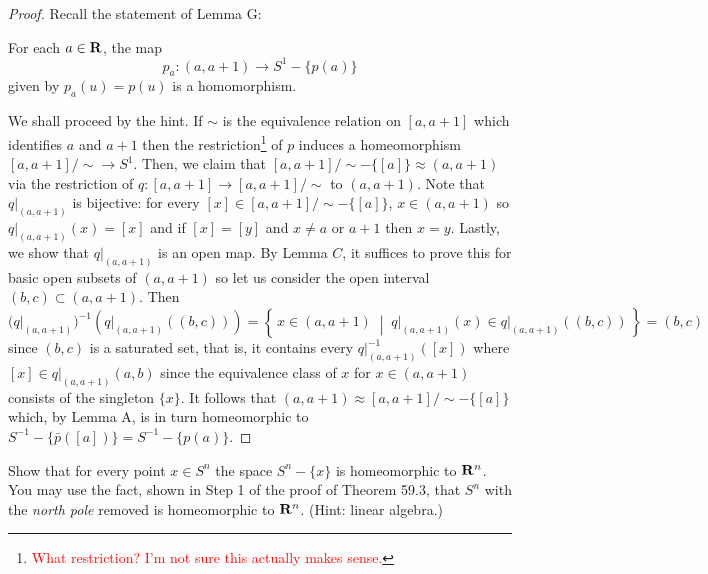 \begin{proof}
Recall the statement of Lemma G:
\begin{lemma*}[G]
For each $a\in\mathbf{R}$, the map
\[
p_a\colon(a,a+1)\longrightarrow S^1-\{p(a)\}
\]
given by $p_a(u)=p(u)$ is a homomorphism.
\end{lemma*}
We shall proceed by the hint. If $\sim$ is the equivalence
relation on $[a,a+1]$ which identifies $a$ and $a+1$ then the
restriction\footnote{\textcolor{Red}{What restriction? I'm not sure this
actually makes sense.}} of $p$ induces a homeomorphism $[a,a+1]/{\sim}\to
S^1$. Then, we claim that $[a,a+1]/{\sim}-\{[a]\}\approx(a,a+1)$ via the
restriction of $q\colon[a,a+1]\to[a,a+1]/{\sim}$ to $(a,a+1)$. Note that
$\left.q\right|_{(a,a+1)}$ is bijective: for every
$[x]\in[a,a+1]/{\sim}-\{[a]\}$, $x\in(a,a+1)$ so
$\left.q\right|_{(a,a+1)}(x)=[x]$ and if $[x]=[y]$ and $x\neq a$ or $a+1$
then $x=y$. Lastly, we show that $\left.q\right|_{(a,a+1)}$ is an open
map. By Lemma $C$, it suffices to prove this for basic open subsets of
$(a,a+1)$ so let us consider the open interval
$(b,c)\subset(a,a+1)$. Then
\[
\bigr(\left.q\right|_{(a,a+1)}\bigl)^{-1}\left(\left.q\right|_{(a,a+1)}((b,c))\right)
=\left\{\,x\in(a,a+1)\;\middle|\;\left.q\right|_{(a,a+1)}(x)\in\left.q\right|_{(a,a+1)}((b,c))\,\right\}
=(b,c)
\]
since $(b,c)$ is a saturated set, that is, it contains every
$\left.q\right|_{(a,a+1)}^{-1}([x])$ where
$[x]\in\left.q\right|_{(a,a+1)}(a,b)$ since the equivalence class of $x$
for $x\in(a,a+1)$ consists of the singleton $\{x\}$. It follows that
$(a,a+1)\approx[a,a+1]/{\sim}-\{[a]\}$ which, by Lemma A, is in turn
homeomorphic to $S^{-1}-\{\bar p([a])\}=S^{-1}-\{p(a)\}$.
\end{proof}
\newpage
\begin{problem}[(C)]
Show that for every point $x\in S^n$ the space $S^n-\{x\}$ is homeomorphic to
$\mathbf{R}^n$. You may use the fact, shown in Step 1 of the proof of Theorem
59.3, that $S^n$ with the \emph{north pole} removed is homeomorphic to
$\mathbf{R}^n$. (Hint: linear algebra.)
\end{problem}
